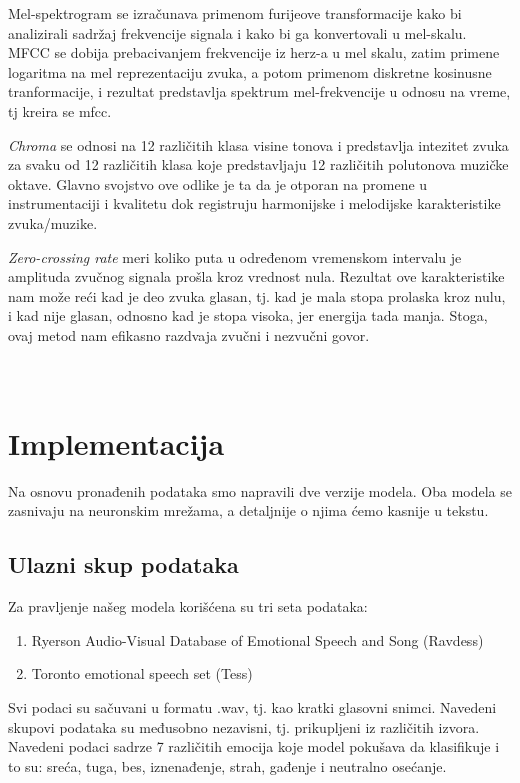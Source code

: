 \documentclass{article}
\begin{document}
Mel-spektrogram se izračunava primenom furijeove transformacije kako bi analizirali sadržaj frekvencije signala i kako bi ga konvertovali u mel-skalu.
MFCC se dobija prebacivanjem frekvencije iz herz-a u mel skalu, zatim primene logaritma na mel reprezentaciju zvuka, a potom primenom diskretne kosinusne tranformacije, i rezultat predstavlja spektrum mel-frekvencije u odnosu na vreme, tj kreira se mfcc.


\textit{Chroma} se odnosi na 12 različitih klasa visine tonova i predstavlja intezitet zvuka za svaku od 12 različitih klasa koje predstavljaju 12 različitih polutonova muzičke oktave. Glavno svojstvo ove odlike je ta da je otporan na promene u instrumentaciji i kvalitetu dok registruju harmonijske i melodijske karakteristike zvuka/muzike.

\textit{Zero-crossing rate} meri koliko puta u određenom vremenskom intervalu je amplituda zvučnog signala prošla kroz vrednost nula. Rezultat ove karakteristike nam može reći kad je deo zvuka glasan, tj. kad je mala stopa prolaska kroz nulu, i kad nije glasan, odnosno kad je stopa visoka, jer energija tada manja. Stoga, ovaj metod nam efikasno razdvaja zvučni i nezvučni govor.
\\
\\
\\
\section{Implementacija}
Na osnovu pronađenih podataka smo napravili dve verzije modela. Oba modela se zasnivaju na neuronskim mrežama, a detaljnije o njima ćemo kasnije u tekstu. 

\subsection{Ulazni skup podataka}
Za pravljenje našeg modela korišćena su tri seta podataka: 
    \begin{enumerate}
    \item Ryerson Audio-Visual Database of Emotional Speech and Song (Ravdess)
    \item Toronto emotional speech set (Tess)
    \end{enumerate}
\newline
Svi podaci su sačuvani u formatu .wav, tj. kao kratki glasovni snimci. Navedeni skupovi podataka su međusobno nezavisni, tj. prikupljeni iz različitih izvora. Navedeni podaci sadrze 7 različitih emocija koje model pokušava da klasifikuje i to su: sreća, tuga, bes, iznenađenje, strah, gađenje i neutralno osećanje. 
\end{document}
